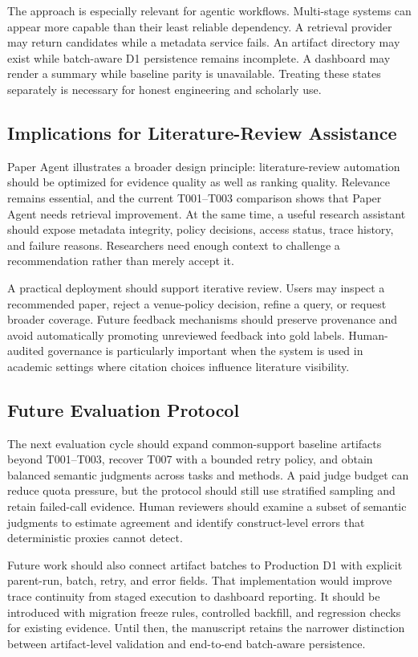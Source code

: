 \documentclass[10pt,twocolumn]{article}
\begin{document}
The approach is especially relevant for agentic workflows. Multi-stage systems can appear more capable than their least reliable dependency. A retrieval provider may return candidates while a metadata service fails. An artifact directory may exist while batch-aware D1 persistence remains incomplete. A dashboard may render a summary while baseline parity is unavailable. Treating these states separately is necessary for honest engineering and scholarly use.

\subsection{Implications for Literature-Review Assistance}
Paper Agent illustrates a broader design principle: literature-review automation should be optimized for evidence quality as well as ranking quality. Relevance remains essential, and the current T001--T003 comparison shows that Paper Agent needs retrieval improvement. At the same time, a useful research assistant should expose metadata integrity, policy decisions, access status, trace history, and failure reasons. Researchers need enough context to challenge a recommendation rather than merely accept it.

A practical deployment should support iterative review. Users may inspect a recommended paper, reject a venue-policy decision, refine a query, or request broader coverage. Future feedback mechanisms should preserve provenance and avoid automatically promoting unreviewed feedback into gold labels. Human-audited governance is particularly important when the system is used in academic settings where citation choices influence literature visibility.

\subsection{Future Evaluation Protocol}
The next evaluation cycle should expand common-support baseline artifacts beyond T001--T003, recover T007 with a bounded retry policy, and obtain balanced semantic judgments across tasks and methods. A paid judge budget can reduce quota pressure, but the protocol should still use stratified sampling and retain failed-call evidence. Human reviewers should examine a subset of semantic judgments to estimate agreement and identify construct-level errors that deterministic proxies cannot detect.

Future work should also connect artifact batches to Production D1 with explicit parent-run, batch, retry, and error fields. That implementation would improve trace continuity from staged execution to dashboard reporting. It should be introduced with migration freeze rules, controlled backfill, and regression checks for existing evidence. Until then, the manuscript retains the narrower distinction between artifact-level validation and end-to-end batch-aware persistence.
\end{document}
